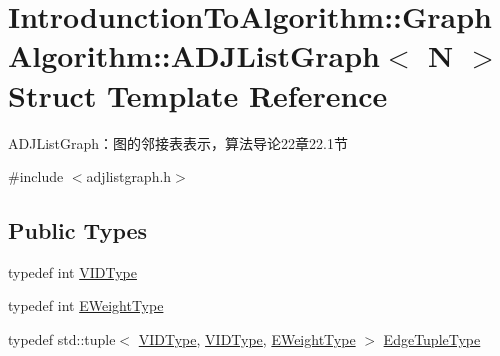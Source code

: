 \hypertarget{struct_introdunction_to_algorithm_1_1_graph_algorithm_1_1_a_d_j_list_graph}{}\section{Introdunction\+To\+Algorithm\+:\+:Graph\+Algorithm\+:\+:A\+D\+J\+List\+Graph$<$ N $>$ Struct Template Reference}
\label{struct_introdunction_to_algorithm_1_1_graph_algorithm_1_1_a_d_j_list_graph}


A\+D\+J\+List\+Graph：图的邻接表表示，算法导论22章22.1节  




{\ttfamily \#include $<$adjlistgraph.\+h$>$}

\subsection*{Public Types}
\begin{DoxyCompactItemize}
\item 
typedef int \hyperlink{struct_introdunction_to_algorithm_1_1_graph_algorithm_1_1_a_d_j_list_graph_aaa2c152e1ccafbe5556a15141d9d31b2}{V\+I\+D\+Type}
\item 
typedef int \hyperlink{struct_introdunction_to_algorithm_1_1_graph_algorithm_1_1_a_d_j_list_graph_ae178ce485958d261c40b7beb8dfe9d0a}{E\+Weight\+Type}
\item 
typedef std\+::tuple$<$ \hyperlink{struct_introdunction_to_algorithm_1_1_graph_algorithm_1_1_a_d_j_list_graph_aaa2c152e1ccafbe5556a15141d9d31b2}{V\+I\+D\+Type}, \hyperlink{struct_introdunction_to_algorithm_1_1_graph_algorithm_1_1_a_d_j_list_graph_aaa2c152e1ccafbe5556a15141d9d31b2}{V\+I\+D\+Type}, \hyperlink{struct_introdunction_to_algorithm_1_1_graph_algorithm_1_1_a_d_j_list_graph_ae178ce485958d261c40b7beb8dfe9d0a}{E\+Weight\+Type} $>$ \hyperlink{struct_introdunction_to_algorithm_1_1_graph_algorithm_1_1_a_d_j_list_graph_ad84ed29dc772f53561f644c091dd642e}{Edge\+Tuple\+Type}
\end{DoxyCompactItemize}
